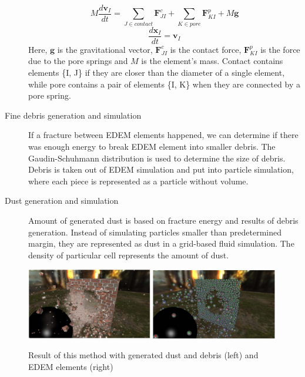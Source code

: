 \begin{description}
\[M\frac{d\mathbf{v}_I}{dt} = \sum_{J \in contact}^{} \mathbf{F}_{JI}^c + \sum_{K \in pore}^{} \mathbf{F}_{KI}^p + M\mathbf{g} \]
\[ \frac{d\mathbf{x}_I}{dt} = \mathbf{v}_I \]
Here, $\mathbf{g}$ is the gravitational vector, $\mathbf{F}^c_{JI}$ is the contact force, $\mathbf{F}^p_{KI}$ is the force due to the pore springs and $\mathit{M}$ is the element’s mass. Contact contains elements \{I, J\} if they are closer than the diameter of a single element, while pore
contains a pair of elements \{I, K\} when they are connected by a pore spring.

\item[Fine debris generation and simulation] If a fracture between EDEM elements happened, we can determine if there was enough energy to break EDEM element into smaller debris. The Gaudin-Schuhmann distribution  is used to determine the size of debris. Debris is taken out of EDEM simulation and put into particle simulation, where each piece is represented as a particle without volume.

\item[Dust generation and simulation] Amount of generated dust is based on fracture energy and results of debris generation. Instead of simulating particles smaller than predetermined margin, they are represented as dust in a grid-based fluid simulation. The density of particular cell represents the amount of dust.

\end{description}

 \begin{figure}
        \centering
        \includegraphics[width=0.49\textwidth]{img/edem_real}
        \includegraphics[width=0.49\textwidth]{img/edem}
        \caption{Result of this method with generated dust and debris (left) and EDEM elements (right) \cite{edem}}
        \label{fig:edem}
    \end{figure}
   
